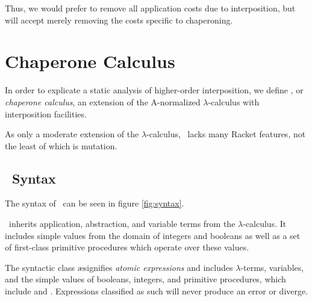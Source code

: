\documentclass{sigplanconf}
\begin{document}
Thus, we would prefer to remove all application costs due to interposition, but will accept merely removing the costs specific to chaperoning.

\section{Chaperone Calculus}

In order to explicate a static analysis of higher-order interposition, we define \chapcalc, or \emph{chaperone calculus}, an extension of the A-normalized $\lambda$-calculus with interposition facilities.

As only a moderate extension of the $\lambda$-calculus, \chapcalc\ lacks many Racket features, not the least of which is mutation.


\subsection{\chapcalc\ Syntax}

The syntax of \chapcalc\ can be seen in figure \ref{fig:syntax}.

\chapcalc\ inherits application, abstraction, and variable terms from the $\lambda$-calculus.
It includes simple values from the domain of integers and booleans as well as a set of first-class primitive procedures which operate over these values.

The syntactic class \ae signifies \emph{atomic expressions} and includes $\lambda$-terms, variables, and the simple values of booleans, integers, and primitive procedures, which include  and .
Expressions classified as such will never produce an error or diverge.
\end{document}
